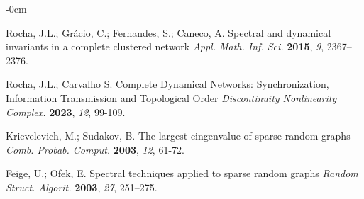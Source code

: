 \documentclass[journal,article,submit,pdftex,moreauthors]{Definitions/mdpi}
\begin{document}
\begin{adjustwidth}{-\extralength}{0cm}
\begin{thebibliography}{999}
 Rocha, J.L.; Gr\'{a}cio, C.; Fernandes, S.; Caneco, A. Spectral and dynamical invariants in a complete clustered network {\em Appl. Math. Inf. Sci.} {\bf 2015}, {\em 9}, 2367--2376. 	
							
 Rocha, J.L.; Carvalho S. Complete Dynamical Networks: Synchronization, Information Transmission and Topological Order {\em Discontinuity Nonlinearity Complex.} {\bf 2023}, {\em 12}, 99-109.

 Krievelevich, M.; Sudakov, B. The largest eingenvalue of sparse random graphs {\em Comb. Probab. Comput.} {\bf 2003}, {\em 12}, 61-72.

 Feige, U.; Ofek, E. Spectral techniques applied to sparse random graphs {\em Random Struct. Algorit.} {\bf 2003}, {\em 27}, 251–275. 









\end{thebibliography}
\end{adjustwidth}
\end{document}

